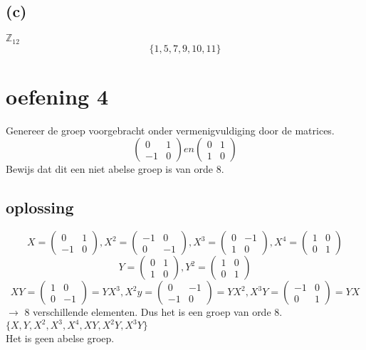 \documentclass[12pt,a4paper]{article}
\begin{document}
\subsection*{(c)}
$\mathbb{Z}_{12}$\\
\[ \{ 1,5,7,9,10,11 \} \]

\section*{oefening 4}

Genereer de groep voorgebracht onder vermenigvuldiging door de matrices.
\[ \left( \begin{array}{cc}
0 & 1 \\
-1 & 0
\end{array} \right)
en
\left( \begin{array}{cc}
0 & 1 \\
1 & 0
\end{array} \right)
\]
Bewijs dat dit een niet abelse groep is van orde 8.
\subsection*{oplossing}
\[
X=
\begin{pmatrix}
0 &1\\
-1&0
\end{pmatrix}
, X^2=
\begin{pmatrix}
-1&0\\
0&-1
\end{pmatrix}
,X^3=
\begin{pmatrix}
0 & -1\\
1&0
\end{pmatrix}
,X^4=
\begin{pmatrix}
1 & 0\\
0 & 1
\end{pmatrix}
\]
\[
Y=
\begin{pmatrix}
0 & 1\\
1 & 0
\end{pmatrix}
,Y^2=
\begin{pmatrix}
1&0\\
0&1
\end{pmatrix}
\]
\[
XY=
\begin{pmatrix}
1 &0\\
0 &-1
\end{pmatrix}
=YX^3,X^2y=
\begin{pmatrix}
0 &- 1\\
-1 &0
\end{pmatrix}
=YX^2,X^3Y=
\begin{pmatrix}
-1 & 0\\
0&1
\end{pmatrix}
=YX
\]
$\rightarrow$ 8 verschillende elementen. Dus het is een groep van orde 8.
\\$\{X,Y,X^2,X^3,X^4,XY,X^2Y,X^3Y\}$
\\Het is geen abelse groep.
\end{document}
